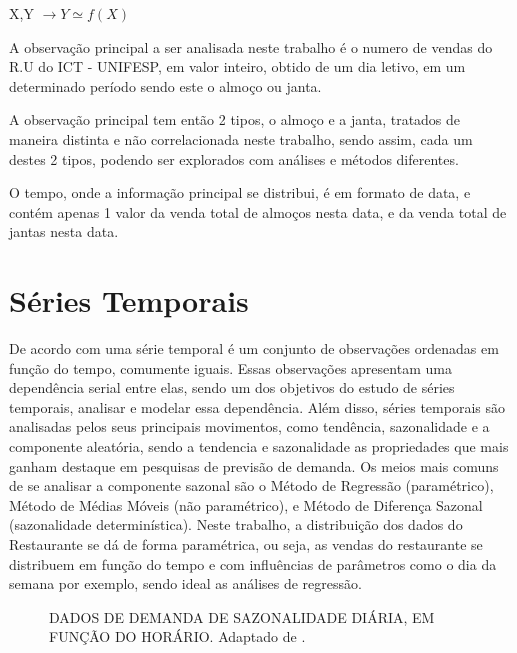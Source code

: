 \documentclass[	12pt, Times, openright, twoside, a4paper, english, brazil]{abntex2}
\begin{document}
X,Y $\rightarrow Y \simeq f(X) $

A observação principal a ser analisada neste trabalho é o numero de vendas do R.U do ICT - UNIFESP, em valor inteiro, obtido de um dia letivo, em um determinado período sendo este o almoço ou janta.

A observação principal tem então 2 tipos, o almoço e a janta, tratados de maneira distinta e não correlacionada neste trabalho, sendo assim, cada um destes 2 tipos, podendo ser explorados com análises e métodos diferentes.

O tempo, onde a informação principal se distribui, é em formato de data, e contém apenas 1 valor da venda total de almoços nesta data, e da venda total de jantas nesta data.

\section{Séries Temporais}
De acordo com  \cite{Morettin1987} uma série temporal é um conjunto de observações ordenadas em função do tempo, comumente iguais. Essas observações apresentam uma dependência serial entre elas, sendo um dos objetivos do estudo de séries temporais, analisar e modelar essa dependência. Além disso, séries temporais são analisadas pelos seus principais movimentos, como tendência, sazonalidade e a componente aleatória, sendo a tendencia e sazonalidade as propriedades que mais ganham destaque em pesquisas de previsão de demanda. Os meios mais comuns de se analisar a componente sazonal são o Método de Regressão (paramétrico), Método de Médias Móveis (não paramétrico), e Método de Diferença Sazonal (sazonalidade determinística).  Neste trabalho, a distribuição dos dados do Restaurante se dá de forma paramétrica, ou seja, as vendas do restaurante se distribuem em função do tempo e com influências de parâmetros como o dia da semana por exemplo, sendo ideal as análises de regressão.
\begin{figure}[!ht]
\caption{DADOS DE DEMANDA DE SAZONALIDADE DIÁRIA, EM FUNÇÃO DO HORÁRIO. Adaptado de \cite{RUAS2012}.\label{fig:seriesTemporais}}
\end{figure}
\end{document}
